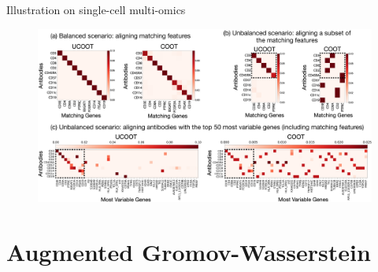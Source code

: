 \documentclass{beamer}
\begin{document}
\begin{frame}{Illustration on single-cell multi-omics}
\scriptsize
\begin{figure}
      \centering
      \includegraphics[width=1.05\linewidth, keepaspectratio=true]{OT_new/genes-alignments.pdf}
  \end{figure}
\end{frame}

\section{Augmented Gromov-Wasserstein}
\end{document}
